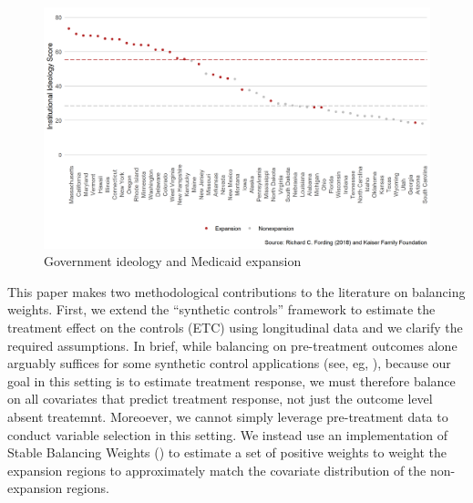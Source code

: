 \documentclass[12pt]{article}
\begin{document}
\begin{figure}
    \begin{center}
    \includegraphics[scale=0.7]{01_Plots/political-expansion-plot.png}
    \caption{Government ideology and Medicaid expansion}
    \label{fig:stateideology}
    \end{center}
\end{figure}

This paper makes two methodological contributions to the literature on balancing weights. First, we extend the ``synthetic controls'' framework to estimate the treatment effect on the controls (ETC) using longitudinal data and we clarify the required assumptions. In brief, while balancing on pre-treatment outcomes alone arguably suffices for some synthetic control applications (see, eg, \cite{botosaru2017role}), because our goal in this setting is to estimate treatment response, we must therefore balance on all covariates that predict treatment response, not just the outcome level absent treatemnt. Moreoever, we cannot simply leverage pre-treatment data to conduct variable selection in this setting. We instead use an implementation of Stable Balancing Weights (\cite{zubizarreta2015stable}) to estimate a set of positive weights to weight the expansion regions to approximately match the covariate distribution of the non-expansion regions. 
\end{document}
